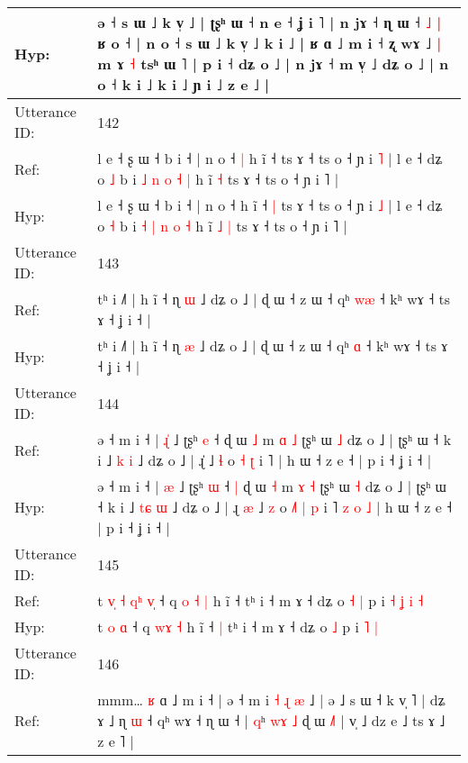 \documentclass[10pt]{article}
\DeclareRobustCommand{\hl}[1]{{\textcolor{red}{#1}}}
\begin{document}
\begin{longtable}{ll}
 \\
Hyp: & ə ˧ s ɯ ˩ k v̩ ˩ | ʈʂʰ ɯ ˧ n e ˧ ʝ i ˥ | n jɤ ˧ ɳ ɯ ˧\hl{}\hl{} \hl{˩} \hl{|} ʁ o ˧ | n o ˧ s ɯ ˩ k v̩ ˩ k i ˩ | ʁ ɑ ˩ m i ˧\hl{}\hl{} ʐ wɤ ˩\hl{ }\hl{|} m ɤ \hl{˧} tsʰ ɯ \hl{}˥ | p i ˧ dʑ o ˩ | n jɤ ˧ m v̩ ˩ dʑ o ˩ | n o ˧ k i ˩ k i ˩ ɲ i ˩ z e ˩ |
 \\
\midrule
Utterance ID: & 142 \\
Ref: & l e ˧ ʂ ɯ ˧ b i ˧ | n o ˧\hl{ }\hl{|} h ĩ ˧\hl{}\hl{} ts ɤ ˧ ts o ˧ ɲ i \hl{˥} | l e ˧ dʑ o \hl{˩} b i \hl{˩} \hl{n} \hl{o} \hl{˧} \hl{|} h ĩ\hl{}\hl{} \hl{˧} ts ɤ ˧ ts o ˧ ɲ i ˥ |
 \\
Hyp: & l e ˧ ʂ ɯ ˧ b i ˧ | n o ˧\hl{}\hl{} h ĩ ˧\hl{ }\hl{|} ts ɤ ˧ ts o ˧ ɲ i \hl{˩} | l e ˧ dʑ o \hl{˧} b i \hl{˧} \hl{|} \hl{n} \hl{o} \hl{˧} h ĩ\hl{ }\hl{˩} \hl{|} ts ɤ ˧ ts o ˧ ɲ i ˥ |
 \\
\midrule
Utterance ID: & 143 \\
Ref: & tʰ i ˩˥ | h ĩ ˧ ɳ \hl{ɯ} ˩ dʑ o ˩ | ɖ ɯ ˧ z ɯ ˧ qʰ \hl{w}\hl{æ} ˧ kʰ wɤ ˧ ts ɤ ˧ ʝ i ˧ |
 \\
Hyp: & tʰ i ˩˥ | h ĩ ˧ ɳ \hl{æ} ˩ dʑ o ˩ | ɖ ɯ ˧ z ɯ ˧ qʰ \hl{}\hl{ɑ} ˧ kʰ wɤ ˧ ts ɤ ˧ ʝ i ˧ |
 \\
\midrule
Utterance ID: & 144 \\
Ref: & ə ˧ m i ˧ | \hl{ɻ}\hl{̍} ˩ ʈʂʰ \hl{e} ˧\hl{}\hl{} ɖ ɯ \hl{˩} m \hl{ɑ} \hl{˩} ʈʂʰ ɯ \hl{˩} dʑ o ˩ | ʈʂʰ ɯ ˧ k i ˩ \hl{}\hl{k} \hl{i} ˩ dʑ o ˩ | ɻ\hl{}\hl{̍} ˩ \hl{ɬ} o\hl{}\hl{}\hl{} \hl{˧} \hl{ʈ} i ˥\hl{}\hl{}\hl{}\hl{}\hl{}\hl{} | h ɯ ˧ z e ˧ | p i ˧ ʝ i ˧ |
 \\
Hyp: & ə ˧ m i ˧ | \hl{}\hl{æ} ˩ ʈʂʰ \hl{ɯ} ˧\hl{ }\hl{|} ɖ ɯ \hl{˧} m \hl{ɤ} \hl{˧} ʈʂʰ ɯ \hl{˧} dʑ o ˩ | ʈʂʰ ɯ ˧ k i ˩ \hl{t}\hl{ɕ} \hl{ɯ} ˩ dʑ o ˩ | ɻ\hl{ }\hl{æ} ˩ \hl{z} o\hl{ }\hl{˩}\hl{˥} \hl{|} \hl{p} i ˥\hl{ }\hl{z}\hl{ }\hl{o}\hl{ }\hl{˩} | h ɯ ˧ z e ˧ | p i ˧ ʝ i ˧ |
 \\
\midrule
Utterance ID: & 145 \\
Ref: & t\hl{ }\hl{v}\hl{̩}\hl{ }\hl{˧} \hl{q}\hl{ʰ} \hl{v}\hl{̩} ˧ q \hl{o}\hl{ }\hl{˧} \hl{|} h ĩ ˧\hl{}\hl{} tʰ i ˧ m ɤ ˧ dʑ o\hl{ }\hl{˧} \hl{|} p i\hl{ }\hl{˧}\hl{ }\hl{ʝ} \hl{i} \hl{˧}
 \\
Hyp: & t\hl{}\hl{}\hl{}\hl{}\hl{} \hl{}\hl{o} \hl{}\hl{ɑ} ˧ q \hl{}\hl{w}\hl{ɤ} \hl{˧} h ĩ ˧\hl{ }\hl{|} tʰ i ˧ m ɤ ˧ dʑ o\hl{}\hl{} \hl{˩} p i\hl{}\hl{}\hl{}\hl{} \hl{˥} \hl{|}
 \\
\midrule
Utterance ID: & 146 \\
Ref: & mmm…\hl{ }\hl{ʁ} ɑ ˩ m i ˧ | ə ˧ m i\hl{ }\hl{˧}\hl{ }\hl{ɻ}\hl{ }\hl{æ} ˩ | ə ˩ s ɯ ˧ k v̩ ˥ | dʑ ɤ ˩ ɳ \hl{ɯ} ˧\hl{}\hl{} qʰ wɤ ˧ ɳ ɯ ˧ | \hl{q}ʰ \hl{w}\hl{ɤ} \hl{˩} ɖ ɯ \hl{˩}\hl{˥} | v̩ ˩ dz e ˩ ts ɤ ˩ z e ˥ |

\end{longtable}
\end{document}

